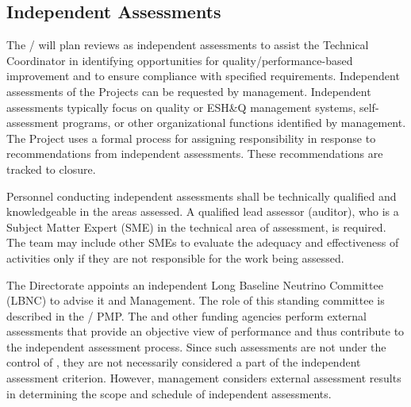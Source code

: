 \subsection{Independent Assessments}

The /  will plan reviews as independent assessments
to assist the  Technical Coordinator in identifying opportunities
for quality/performance-based improvement and to ensure compliance
with specified requirements. Independent assessments of the 
Projects can be requested by  management. Independent assessments
typically focus on quality or ESH\&Q management systems, self-
assessment programs, or other organizational functions identified by
management. The  Project uses a formal process for assigning
responsibility in response to recommendations from independent
assessments. These recommendations are tracked to closure.

Personnel conducting independent assessments shall be technically
qualified and knowledgeable in the areas assessed. A qualified lead
assessor (auditor), who is a Subject Matter Expert (SME) in the
technical area of assessment, is required. The team may include other
SMEs to evaluate the adequacy and effectiveness of activities only if
they are not responsible for the work being assessed.

The \fnal Directorate appoints an independent Long Baseline
Neutrino Committee (LBNC) to advise it and  Management. The role
of this standing committee is described in the / PMP. The 
and other funding agencies perform external assessments that provide
an objective view of performance and thus contribute to the
independent assessment process. Since such assessments are not under
the control of , they are not necessarily considered a part of the
independent assessment criterion. However,  management considers
external assessment results in determining the scope and schedule of
independent assessments.

